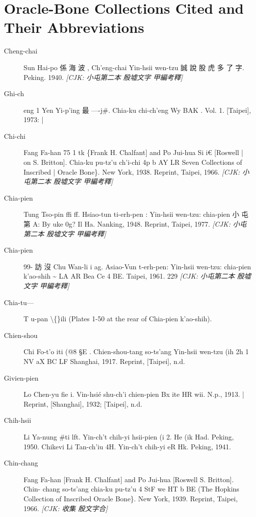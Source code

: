 \section*{Oracle-Bone Collections Cited and Their Abbreviations}

\begin{description}
  \item[Cheng-chai] Sun Hai-po 係 海 波 , Ch'eng-chai Yin-hsii wen-tzu 誠 說 股 虎 多 了 字. Peking. 1940. \hfill\textit{[CJK: 小屯第二本 殷墟文字 甲編考釋]}
  \item[Ghi-ch] eng 1 Yen Yi-p'ing 最 —-j\#. Chia-ku chi-ch'eng Wy BAK . Vol. 1. [Taipei], 1973: |
  \item[Chi-chi] Fang Fa-han 75 1 tk \{Frank H. Chalfant] and Po Jui-hua Si i€ [Roswell | on S. Britton]. Chia-ku pu-tz'u ch'i-chi 4p b AY LR Seven Collections of Inscribed | Oracle Bone\}. New York, 1938. Reprint, Taipei, 1966. \hfill\textit{[CJK: 小屯第二本 殷墟文字 甲編考釋]}
  \item[Chia-pien] Tung Tso-pin ffi ff. Hsiao-tun ti-erh-pen : Yin-hsii wen-tzu: chia-pien 小 屯 第 A: By uke 0g? Il Ha. Nanking, 1948. Reprint, Taipei, 1977. \hfill\textit{[CJK: 小屯第二本 殷墟文字 甲編考釋]}
  \item[Chia-pien] 99- 訪 沒 Chu Wan-li i ag. Asiao-Vun t-erh-pen: Yin-hsii wen-tzu: chia-pien k'ao-shih \~{} LA AR Bea Ce 4 BE. Taipei, 1961. 229 \hfill\textit{[CJK: 小屯第二本 殷墟文字 甲編考釋]}
  \item[Chia-tu—] T u-pan \textbackslash\{\}ili (Plates 1-50 at the rear of Chia-pien k'ao-shih).
  \item[Chien-shou] Chi Fo-t'o iti (@8 §E . Chien-shou-tang so-ts'ang Yin-hsii wen-tzu (ih 2h 1 NV aX BC LF Shanghai, 1917. Reprint, [Taipei], n.d.
  \item[Givien-pien] Lo Chen-yu fie i. Vin-hsié shu-ch'i chien-pien Bx ite HR wii. N.p., 1913. | Reprint, [Shanghai], 1932; [Taipei], n.d.
  \item[Chih-hsii] Li Ya-nung \#ti lft. Yin-ch't chih-yi hsii-pien (i 2. He (ik Had. Peking, 1950. Chikevi Li Tan-ch'iu 4H. Yin-ch't chih-yi eR Hk. Peking, 1941.
  \item[Chin-chang] Fang Fa-han [Frank H. Chalfant] and Po Jui-hua [Roswell S. Britton]. Chin- chang so-ts'ang chia-ku pu-tz'u 4 StF we HT b BE (The Hopkins Collection of Inscribed Oracle Bone\}. New York, 1939. Reprint, Taipei, 1966. \hfill\textit{[CJK: 收集 殷文字合]}

\end{description}
